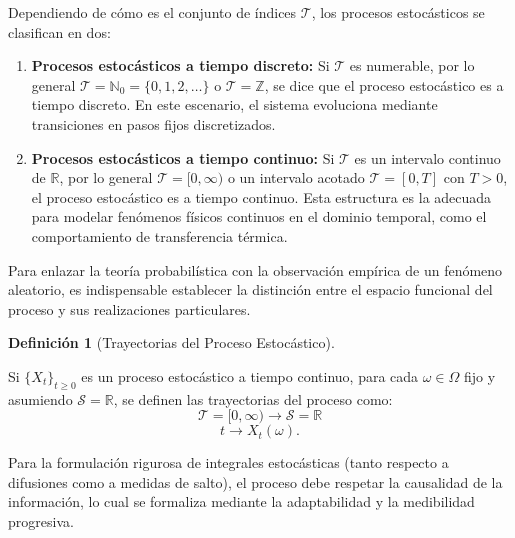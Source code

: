 \documentclass[
  spanish,
  letterpaper,
  DIV=11,
  numbers=noendperiod]{scrreprt}
\providecommand{\tightlist}{%
  \setlength{\itemsep}{0pt}\setlength{\parskip}{0pt}}
\theoremstyle{plain}
\theoremstyle{plain}
\theoremstyle{plain}
\theoremstyle{definition}
\newtheorem{definition}{Definición}[chapter]
\theoremstyle{remark}
\begin{document}
Dependiendo de cómo es el conjunto de índices \(\mathcal{T}\), los
procesos estocásticos se clasifican en dos:

\begin{enumerate}
\def\labelenumi{\arabic{enumi}.}
\tightlist
\item
  \textbf{Procesos estocásticos a tiempo discreto:} Si \(\mathcal{T}\)
  es numerable, por lo general
  \(\mathcal{T} = \mathbb{N}_0 = \{0, 1, 2, \dots\}\) o
  \(\mathcal{T} = \mathbb{Z}\), se dice que el proceso estocástico es a
  tiempo discreto. En este escenario, el sistema evoluciona mediante
  transiciones en pasos fijos discretizados.
\item
  \textbf{Procesos estocásticos a tiempo continuo:} Si \(\mathcal{T}\)
  es un intervalo continuo de \(\mathbb{R}\), por lo general
  \(\mathcal{T} = [0, \infty)\) o un intervalo acotado
  \(\mathcal{T} = [0, T]\) con \(T > 0\), el proceso estocástico es a
  tiempo continuo. Esta estructura es la adecuada para modelar fenómenos
  físicos continuos en el dominio temporal, como el comportamiento de
  transferencia térmica.
\end{enumerate}

Para enlazar la teoría probabilística con la observación empírica de un
fenómeno aleatorio, es indispensable establecer la distinción entre el
espacio funcional del proceso y sus realizaciones particulares.

\begin{definition}[Trayectorias del Proceso
Estocástico]\protect\hypertarget{def-trayectoria}{}\label{def-trayectoria}

Si \(\{X_t\}_{t \geq 0}\) es un proceso estocástico a tiempo continuo,
para cada \(\omega \in \Omega\) fijo y asumiendo
\(\mathcal{S} = \mathbb{R}\), se definen las trayectorias del proceso
como: \[
    \mathcal{T} = [0, \infty) \rightarrow \mathcal{S} = \mathbb{R}
\] \[
    t \rightarrow X_t(\omega).
\]

\end{definition}

Para la formulación rigurosa de integrales estocásticas (tanto respecto
a difusiones como a medidas de salto), el proceso debe respetar la
causalidad de la información, lo cual se formaliza mediante la
adaptabilidad y la medibilidad progresiva.
\end{document}
